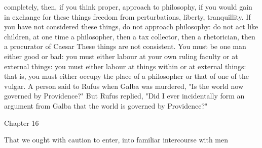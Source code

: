 \documentclass[a4paper]{article}
\begin{document}
completely, then, if you think proper, approach to philosophy, if you would
gain in exchange for these things freedom from perturbations, liberty,
tranquillity. If you have not considered these things, do not approach
philosophy: do not act like children, at one time a philosopher, then a tax
collector, then a rhetorician, then a procurator of Caesar These things are not
consistent. You must be one man either good or bad: you must either labour at
your own ruling faculty or at external things: you must either labour at things
within or at external things: that is, you must either occupy the place of a
philosopher or that of one of the vulgar.
    A person said to Rufus when Galba was murdered, "Is the world now governed
by Providence?" But Rufus replied, "Did I ever incidentally form an argument
from Galba that the world is governed by Providence?"

Chapter 16

That we ought with caution to enter, into familiar intercourse with men
\end{document}
